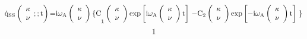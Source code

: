 \documentclass{article}
\begin{document}
\[{\dot{{\rm q}}}_{{\rm SS}}\left( \begin{array}{c}
{\mathbf \kappa } \\ 
\nu  \end{array}
;;{\rm t}\right){\rm =}{{\rm i}{\omega }_{{\rm A}}\left( \begin{array}{c}
{\mathbf \kappa } \\ 
\nu  \end{array}
\right)\{{\rm C}}_{{\rm 1}}\left( \begin{array}{c}
{\mathbf \kappa } \\ 
\nu  \end{array}
\right){\exp  \left[{\rm i}{\omega }_{{\rm A}}\left( \begin{array}{c}
{\mathbf \kappa } \\ 
\nu  \end{array}
\right){\rm t}\right]\ }{\rm -}{{\rm C}}_{{\rm 2}}\left( \begin{array}{c}
{\mathbf \kappa } \\ 
\nu  \end{array}
\right){\exp  \left[{\rm -}{\rm i}{\omega }_{{\rm A}}\left( \begin{array}{c}
{\mathbf \kappa } \\ 
\nu  \end{array}
\right){\rm t}\right]\ }\}\] 
\[1\] 
\end{document}
